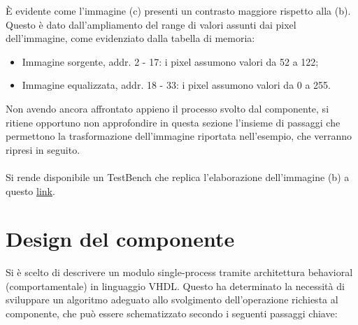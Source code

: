 \documentclass{article}
\begin{document}
\vspace{0.3cm}

È evidente come l'immagine \small (c) \normalsize presenti un contrasto maggiore rispetto alla \small(b)\normalsize. Questo è dato dall'ampliamento del range di valori assunti dai pixel dell'immagine, come evidenziato dalla tabella di memoria:
\begin{itemize}
    \item Immagine sorgente, addr. 2 - 17: i pixel assumono valori da 52 a 122;
    \item Immagine equalizzata, addr. 18 - 33: i pixel assumono valori da 0 a 255.
\end{itemize}

Non avendo ancora affrontato appieno il processo svolto dal componente, si ritiene opportuno non approfondire in questa sezione 
l'insieme di passaggi che permettono la trasformazione dell'immagine riportata nell'esempio, che verranno ripresi in seguito. \\\\
Si rende disponibile un TestBench che replica l'elaborazione dell'immagine \small (b) \normalsize a questo \href{festadelsalame.com}{link}. \par

\vspace{3cm}

\section{Design del componente}
Si è scelto di descrivere un modulo single-process tramite architettura behavioral (comportamentale) in linguaggio VHDL. 
Questo ha determinato la necessità di sviluppare un algoritmo adeguato allo svolgimento dell’operazione richiesta al componente, che può essere schematizzato secondo i seguenti passaggi chiave:
\end{document}
